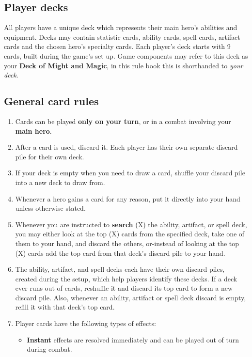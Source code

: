 \documentclass[12pt]{article}
\def\assets{assets}
\def\svgs{\assets/svgs}
\begin{document}
\clearpage
\subsection*{\hypertarget{Playerdecks}{Player decks}}
All players have a unique deck which represents their main hero's abilities and equipment. Decks may contain statistic cards, ability cards, spell cards, artifact cards and the chosen hero’s specialty cards. Each player’s deck starts with 9 cards, built during the game’s set up. Game components may refer to this deck as your \textbf{Deck of Might and Magic}, in this rule book this is shorthanded to \textit{your deck}.
\subsection*{General card rules}
\begin{enumerate}
  \item Cards can be played \textbf{only on your turn}, or in a combat involving your \textbf{main hero}.
  \item After a card is used, discard it. Each player has their own separate discard pile for their own deck.
  \item If your deck is empty when you need to draw a card, shuffle your discard pile into a new deck to draw from.
  \item Whenever a hero gains a card for any reason, put it directly into your hand unless otherwise stated.
  \item Whenever you are instructed to \textbf{search} (X) the ability, artifact, or spell deck, you may either look at the top (X) cards from the specified deck, take one of them to your hand, and discard the others, or-instead of looking at the top (X) cards add the top card from that deck’s discard pile to your hand.
  \item The ability, artifact, and spell decks each have their own discard piles, created during the setup, which help players identify these decks. If a deck ever runs out of cards, reshuffle it and discard its top card to form a new discard pile. Also, whenever an ability, artifact or spell deck discard is empty, refill it with that deck’s top card.
  \item Player cards have the following types of effects:
  \begin{itemize}
        \item \textbf{Instant}  effects are resolved immediately and can be played out of turn during combat.

\end{itemize}
\end{enumerate}
\end{document}

